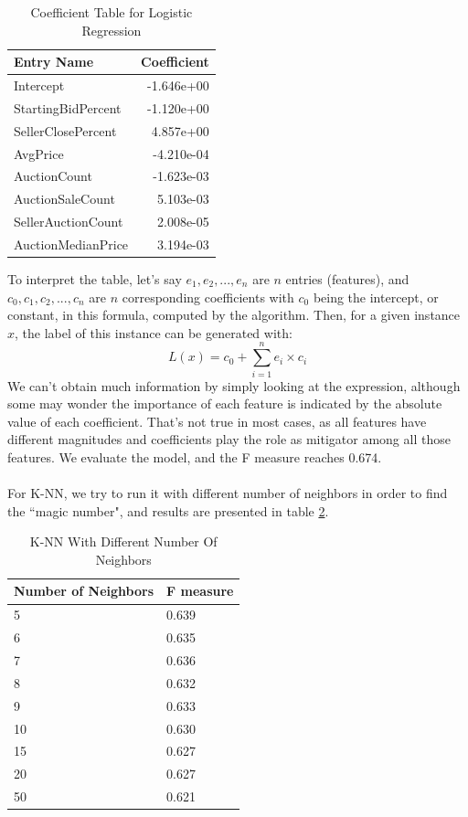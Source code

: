 \documentclass[CEJM,PDF]{cej} %
\begin{document}
\begin{table}[h]
\centering
\caption{Coefficient Table for Logistic Regression}
\label{r-lr}
\begin{tabular}{@{}|l|r|@{}}
\toprule
\hline
Entry Name  & Coefficient \\ \midrule
\hline
Intercept & -1.646e+00   \\
\hline
StartingBidPercent & -1.120e+00 \\
\hline
SellerClosePercent & 4.857e+00  \\
\hline
AvgPrice & -4.210e-04 \\
\hline
AuctionCount & -1.623e-03   \\
\hline
AuctionSaleCount & 5.103e-03 \\
\hline
SellerAuctionCount & 2.008e-05   \\
\hline
AuctionMedianPrice & 3.194e-03  \\ \bottomrule
\hline
\end{tabular}
\end{table}

To interpret the table, let's say $e_1, e_2, ..., e_n$ are $n$ entries (features), and $c_0, c_1, c_2, ..., c_n$ are $n$ corresponding coefficients with $c_0$ being the intercept, or constant, in this formula, computed by the algorithm. Then, for a given instance $x$, the label of this instance can be generated with:
$$L(x) = c_0 + \sum_{i=1}^{n}e_i\times c_i$$
We can't obtain much information by simply looking at the expression, although some may wonder the importance of each feature is indicated by the absolute value of each coefficient. That's not true in most cases, as all features have different magnitudes and coefficients play the role as mitigator among all those features. We evaluate the model, and the F measure reaches 0.674.\\
\\
For K-NN, we try to run it with different number of neighbors in order to find the ``magic number", and results are presented in table \ref{r-knn}.

\begin{table}[h]
\centering
\caption{K-NN With Different Number Of Neighbors}
\label{r-knn}
\begin{tabular}{@{}|l|l|@{}}
\toprule
\hline
Number of Neighbors  & F measure \\ \midrule
\hline
5 & 0.639   \\
\hline
6 & 0.635   \\
\hline
7  & 0.636  \\
\hline
8 & 0.632   \\
\hline
9  & 0.633  \\ 
\hline
10 & 0.630 \\ 
\hline
15 & 0.627 \\ 
\hline
20 & 0.627 \\
\hline
50 & 0.621 \\ \bottomrule
\hline
\end{tabular}
\end{table}
\end{document}
